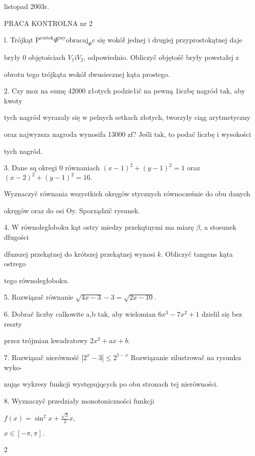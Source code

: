 \documentclass[a4paper,12pt]{article}
\begin{document}
listopad 2003r.

PRACA KONTROLNA nr 2

l. Trójkąt $\mathrm{P}^{\mathrm{r}\mathrm{o}\mathrm{s}\mathrm{t}\mathrm{o}\mathrm{k}}\Phi^{\mathrm{t}\mathrm{n}\mathrm{y}} \mathrm{o}\mathrm{b}\mathrm{r}\mathrm{a}\mathrm{c}\mathrm{a}\mathrm{j}_{\Phi}\mathrm{c}$ się wokół jednej $\mathrm{i}$ drugiej przyprostokątnej daje

bryły $0$ objętościach $V_{1} \mathrm{i} V_{2}$, odpowiednio. Obliczyč objętośč bryły powstałej $\mathrm{z}$

obrotu tego trójkąta wokół dwusiecznej kąta prostego.

2. Czy $\mathrm{m}\mathrm{o}\dot{\mathrm{z}}$ na sumę 42000 z1otych podzie1ič na pewną 1iczbę nagród $\mathrm{t}\mathrm{a}\mathrm{k}$, aby kwoty

tych nagród wyrazaly się $\mathrm{w}$ pelnych setkach złotych, tworzyly ciąg arytmetyczny

oraz najwyzsza nagroda wynosifa 13000 $\mathrm{z}\mathrm{f}$? Jeśli $\mathrm{t}\mathrm{a}\mathrm{k}$, to podač liczbę $\mathrm{i}$ wysokości

tych nagród.

3. Dane sq okregi $0$ równaniach $(x-1)^{2}+(y-1)^{2}=1$ oraz $(x-2)^{2}+(y-1)^{2}=16.$

Wyznaczyč równania wszystkich okręgów stycznych równocześnie do obu danych

okręgów oraz do osi Oy. Sporządzič rysunek.

4. $\mathrm{W}$ równolegloboku kąt ostry miedzy przekqtnymi ma miarę $\beta$, a stosunek dfugości

dfuzszej przekątnej do krótszej przekątnej wynosi $k$. Obliczyč tangens kąta ostrego

tego równoległoboku.

5. Rozwiązač równanie $\sqrt{4x-3}-3=\sqrt{2x-10}.$

6. Dobrač liczby calkowite a,b $\mathrm{t}\mathrm{a}\mathrm{k}$, aby wielomian $6x^{3}-7x^{2}+1$ dzielil się bez reszty

przez trójmian kwadratowy $2x^{2}+ax+b.$

7. Rozwiązač nierównośč $|2^{x}-3|\leq 2^{1-x}$ Rozwiązanie zilustrowač na rysunku wyko-

nując wykresy funkcji występujqcych po obu stronach tej nierówności.

8. Wyznaczyč przedziały monotoniczności funkcji

$f(x)=\displaystyle \sin^{2}x+\frac{\sqrt{3}}{2}x,$

$x\in[-\pi,\pi].$

2
\end{document}
